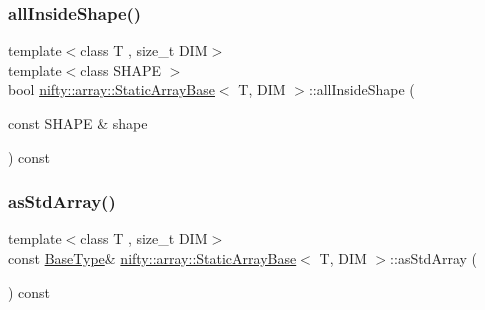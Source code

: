 \subsubsection{\texorpdfstring{all\+Inside\+Shape()}{allInsideShape()}}
{\footnotesize\ttfamily template$<$class T , size\+\_\+t D\+IM$>$ \\
template$<$class S\+H\+A\+PE $>$ \\
bool \hyperlink{classnifty_1_1array_1_1StaticArrayBase}{nifty\+::array\+::\+Static\+Array\+Base}$<$ T, D\+IM $>$\+::all\+Inside\+Shape (\begin{DoxyParamCaption}\item[{const S\+H\+A\+PE \&}]{shape }\end{DoxyParamCaption}) const\hspace{0.3cm}{\ttfamily [inline]}}

\mbox{\label{classnifty_1_1array_1_1StaticArrayBase_a88a05591be79803231598c1c32025ac3}} 
\subsubsection{\texorpdfstring{as\+Std\+Array()}{asStdArray()}\hspace{0.1cm}{\footnotesize\ttfamily [1/2]}}
{\footnotesize\ttfamily template$<$class T , size\+\_\+t D\+IM$>$ \\
const \hyperlink{classnifty_1_1array_1_1StaticArrayBase_a3f376d2a24fad3a47021c36657494759}{Base\+Type}\& \hyperlink{classnifty_1_1array_1_1StaticArrayBase}{nifty\+::array\+::\+Static\+Array\+Base}$<$ T, D\+IM $>$\+::as\+Std\+Array (\begin{DoxyParamCaption}{ }\end{DoxyParamCaption}) const\hspace{0.3cm}{\ttfamily [inline]}}

\mbox{\label{classnifty_1_1array_1_1StaticArrayBase_a205328f2e3ad922e007afe0f9f3e819b}} 
